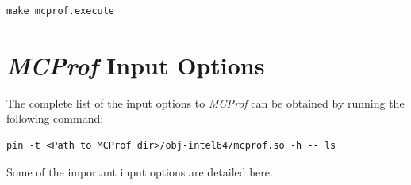 \documentclass[11pt]{article}
\newcommand{\MCPROF}{\emph{MCProf}}
\begin{document}
{
\small
\begin{Verbatim}[frame=single]
make mcprof.execute
\end{Verbatim}
}


\section{\MCPROF{} Input Options}
\label{sec:inputopt}

The complete list of the input options to \MCPROF{} can be obtained by running
the following command:

{
\small
\begin{Verbatim}[frame=single]
pin -t <Path to MCProf dir>/obj-intel64/mcprof.so -h -- ls
\end{Verbatim}
}

Some of the important input options are detailed here.
\end{document}
